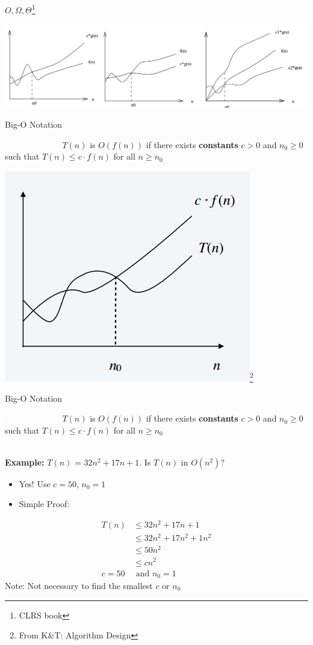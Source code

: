 \documentclass{beamer}
\newcommand{\tblue}[1]{{\Large {\textcolor{azure}{#1}}}}
\begin{document}
\begin{frame}{$O, \Omega, \Theta$\footnote{CLRS book}}
\begin{center}
    \includegraphics[scale=0.32]{allThreeBoundingFunctions.png}
\end{center}
\end{frame}

\begin{frame}{Big-O Notation}

\tblue{Upper bounds:} $T(n)$ is $O(f(n))$ if there exists {\bf constants} $c>0$ and $n_0 \geq 0$ such that
$T(n) \leq c \cdot f(n)$ for all $n \geq n_0$
\begin{center}
    \includegraphics[scale=0.4]{bigOh.png}\footnote{From K\&T: Algorithm Design}
\end{center}
\end{frame}



\begin{frame}{Big-O Notation}

\tblue{Upper bounds:} $T(n)$ is $O(f(n))$ if there exists {\bf constants} $c>0$ and $n_0 \geq 0$ such that
$T(n) \leq c \cdot f(n)$ for all $n \geq n_0$

~\\
\textbf{Example:} $T(n)$ = $32n^2+17n+1$.  Is $T(n)$ in $O(n^2)$? 
\begin{itemize}
\item Yes! Use $c=50$, $n_0=1$
\item Simple Proof:
\end{itemize}
\begin{align*}
T(n) &\leq 32n^2+17n+1 \\
&\leq 32n^2+17n^2+1n^2 \\
&\leq 50n^2\\
&\leq cn^2\\
c=50    &   \text{ and } n_0=1
\end{align*}
Note: Not necessary to find the smallest $c$ or $n_0$
\end{frame}
\end{document}
